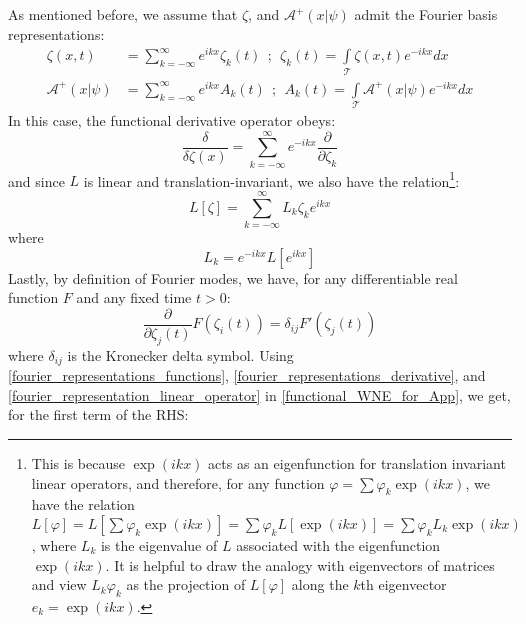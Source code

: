 As mentioned before, we assume that $\zeta$, and $\mathcal{A}^{+}(x|\psi)$ admit the Fourier basis representations:
\begin{equation}
\label{fourier_representations_functions}
\begin{aligned}
\zeta(x,t) &= \sum\limits_{k=-\infty}^{\infty}e^{ikx}\zeta_k(t) \ \ ; \ \ \zeta_k(t) = \int\limits_{\mathcal{T}}\zeta(x,t)e^{-ikx}dx\\
\mathcal{A}^{+}(x|\psi) &= \sum\limits_{k=-\infty}^{\infty}e^{ikx}A_k(t) \ \ ; \ \ A_k(t) = \int\limits_{\mathcal{T}}\mathcal{A}^{+}(x|\psi)e^{-ikx}dx
\end{aligned}
\end{equation}
In this case, the functional derivative operator obeys:
\begin{equation}
\label{fourier_representations_derivative}
    \frac{\delta}{\delta \zeta(x)} = \sum\limits_{k=-\infty}^{\infty}e^{-ikx}\frac{\partial}{\partial \zeta_k}
\end{equation}
and since $L$ is linear and translation-invariant, we also have the relation\footnote{This is because $\exp(ikx)$ acts as an eigenfunction for translation invariant linear operators, and therefore, for any function $\varphi = \sum\varphi_k\exp(ikx)$, we have the relation $L[\varphi] = L[\sum\varphi_k\exp(ikx)]=\sum\varphi_kL[\exp(ikx)]=\sum\varphi_kL_k\exp(ikx)$, where $L_k$ is the eigenvalue of $L$ associated with the eigenfunction $\exp(ikx)$. It is helpful to draw the analogy with eigenvectors of matrices and view $L_k\varphi_k$ as the projection of $L[\varphi]$ along the $k$th eigenvector $e_k = \exp(ikx)$.}:
\begin{equation}
\label{fourier_representation_linear_operator}
    L[\zeta] = \sum\limits_{k=-\infty}^{\infty}L_{k}\zeta_ke^{ikx}
\end{equation}
where 
\begin{equation*}
    L_k = e^{-ikx}L[e^{ikx}]
\end{equation*}
Lastly, by definition of Fourier modes, we have, for any differentiable real function $F$ and any fixed time $t > 0$:
\begin{equation}
\label{fourier_mode_relation}
\frac{\partial}{\partial \zeta_j(t)}F(\zeta_i(t)) = \delta_{ij}F'(\zeta_j(t))
\end{equation}
where $\delta_{ij}$ is the Kronecker delta symbol.
Using \eqref{fourier_representations_functions}, \eqref{fourier_representations_derivative}, and \eqref{fourier_representation_linear_operator} in \eqref{functional_WNE_for_App}, we get, for the first term of the RHS:
